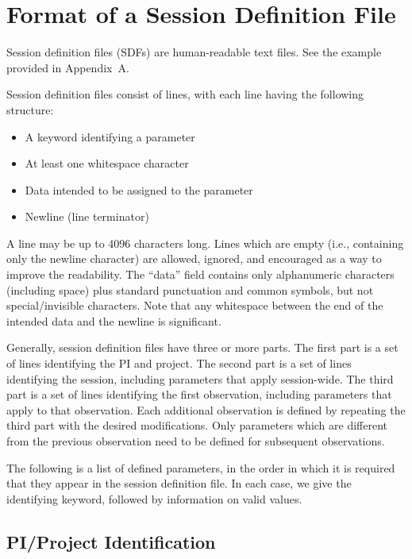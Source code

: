 
\section{Format of a Session Definition File}
\label{ch:sdf-format}

Session definition files (SDFs) are human-readable text files.  See the example provided in Appendix~A.

Session definition files consist of lines, with each line having the following structure:
\begin{itemize}
\item A keyword identifying a parameter
\item At least one whitespace character
\item Data intended to be assigned to the parameter
\item Newline (line terminator)
\end{itemize}

A line may be up to 4096 characters long.  Lines which are empty (i.e., containing only the newline character) are allowed, ignored, and encouraged as a way to improve the readability.  The ``data'' field contains only alphanumeric characters (including space) plus standard punctuation and common symbols, but not special/invisible characters.  Note that any whitespace between the end of the intended data and the newline is significant.

Generally, session definition files have three or more parts.  The first part is a set of lines identifying the PI and project.  The second part is a set of lines identifying the session, including parameters that apply session-wide.  The third part is a set of lines identifying the first observation, including parameters that apply to that observation.  Each additional observation is defined by repeating the third part with the desired modifications.  Only parameters which are different from the previous observation need to be defined for subsequent observations.

The following is a list of defined parameters, in the order in which it is required that they appear in the session definition file.  In each case, we give the identifying keyword, followed by information on valid values.

\subsection{PI/Project Identification}

